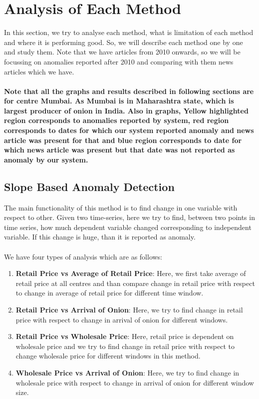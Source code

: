 \documentclass[a4paper,10pt]{report}
\begin{document}
	
\section{Analysis of Each Method}

In this section, we try to analyse each method, what is limitation of each method and where it is performing good. So, we will describe each method one by one and study them. Note that we have articles from 2010 onwards, so we will be focussing on anomalies reported after 2010 and comparing with them news articles which we have. \\
\\
\textbf{Note that all the graphs and results described in following sections are for centre Mumbai. As Mumbai is in Maharashtra state, which is largest producer of onion in India. Also in graphs, Yellow highlighted region corresponds to anomalies reported by system, red region corresponds to dates for which our system reported anomaly and news article was present for that and blue region corresponds to date for which news article was present but that date was not reported as anomaly by our system.}

\subsection{Slope Based Anomaly Detection}
	
		The main functionality of this method is to find change in one variable with respect to other. Given two time-series, here we try to find, between two points in time series, how much dependent variable changed corresponding to independent variable. If this change is huge, than it is reported as anomaly.\\
		\\
		We have four types of analysis which are as follows:
		\begin{enumerate}
			\item \textbf{Retail Price vs Average of Retail Price}: Here, we first take average of retail price at all centres and than compare change in retail price with respect to change in average of retail price for different time window.			
			\item \textbf{Retail Price vs Arrival of Onion}: Here, we try to find change in retail price with respect to change in arrival of onion for different windows. 
			\item \textbf{Retail Price vs Wholesale Price}: Here, retail price is dependent on wholesale price and we try to find change in retail price with respect to change wholesale price for different windows in this method.
			\item \textbf{Wholesale Price vs Arrival of Onion}: Here, we try to find change in wholesale price with respect to change in arrival of onion for different window size.
		\end{enumerate}
		
\end{document}
